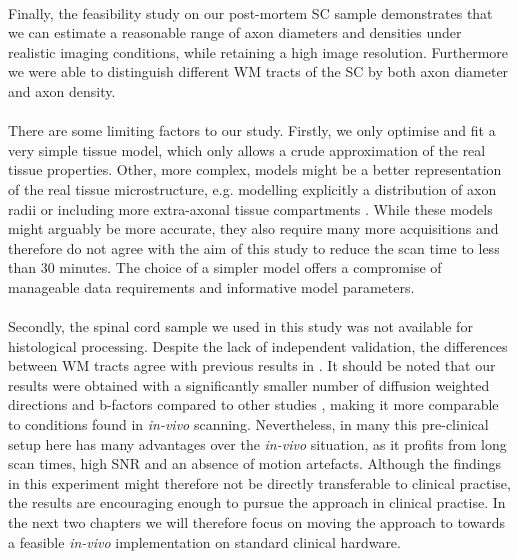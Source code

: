 \paragraph{}
Finally, the feasibility study on our post-mortem SC sample demonstrates that we can estimate a reasonable range of axon diameters and densities under realistic imaging conditions, while retaining a high image resolution. Furthermore we were able to distinguish different WM tracts of the SC by both axon diameter and axon density.
\paragraph{}
There are some limiting factors to our study. Firstly, we only optimise and fit a very simple tissue model, which only allows a crude approximation of the real tissue properties. Other, more complex, models might be a better representation of the real tissue microstructure, e.g. modelling explicitly a distribution of axon radii \citep{Barazany:2009} or including more extra-axonal tissue compartments \citep{Stanisz:1997,Wang:2011,Panagiotaki:2012}.  While these models might arguably be more accurate, they also require many more acquisitions and therefore do not agree with the aim of this study to reduce the scan time to less than 30 minutes. The choice of a simpler model offers a compromise of manageable data requirements and informative model parameters.
\paragraph{}
Secondly, the spinal cord sample we used in this study was not available for histological processing. Despite the lack of independent validation, the differences between WM tracts agree with previous results in \citep{Golabchi:2010}. It should be noted that our results were obtained with a significantly smaller number of diffusion weighted directions and b-factors compared to other studies \citep{Assaf:2008,Barazany:2009,Panagiotaki:2012}, making it more comparable to conditions found in \emph{in-vivo} scanning. Nevertheless, in many this pre-clinical setup here has many advantages over the \emph{in-vivo} situation, as it profits from long scan times, high SNR and an absence of motion artefacts. Although the findings in this experiment might therefore not be directly transferable to clinical practise, the results are encouraging enough to pursue the \SF{} approach in clinical practise. In the next two chapters we will therefore focus on moving the \SF{} approach to towards a feasible \emph{in-vivo} implementation on standard clinical hardware.



